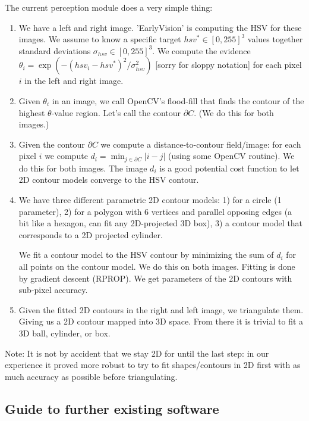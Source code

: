 The current perception module does a very simple thing:
\begin{enumerate}
\item We have a left and right image. 'EarlyVision' is computing the
  HSV for these images. We assume to know a specific target $hsv^*\in[0,255]^3$
  values together standard deviations $\sigma_{hsv}\in[0,255]^3$. We compute
  the evidence $\theta_i = \exp(- (hsv_i-hsv^*)^2/\sigma_{hsv}^2)$ [sorry for
    sloppy notation] for each pixel $i$ in the left and right image.

\item Given $\theta_i$ in an image, we call OpenCV's flood-fill that finds
  the contour of the highest $\theta$-value region. Let's call the contour
  $\partial C$. (We do this for both images.)

\item Given the contour $\partial C$ we compute a distance-to-contour
  field/image: for each pixel $i$ we compute $d_i = \min_{j\in\partial C}
  |i-j|$ (using some OpenCV routine). We do this for both images. The
  image $d_i$ is a good potential cost function to let 2D contour
  models converge to the HSV contour.

\item We have three different parametric 2D contour models: 1) for a
  circle (1 parameter), 2) for a polygon with 6 vertices and parallel
  opposing edges (a bit like a hexagon, can fit any 2D-projected 3D
  box), 3) a contour model that corresponds to a 2D projected
  cylinder.

  We fit a contour model to the HSV contour by minimizing the sum of
  $d_i$ for all points on the contour model. We do this on both
  images. Fitting is done by gradient descent (RPROP). We get
  parameters of the 2D contours with sub-pixel accuracy.

\item Given the fitted 2D contours in the right and left image, we
  triangulate them. Giving us a 2D contour mapped into 3D space. From
  there it is trivial to fit a 3D ball, cylinder, or box.

\end{enumerate}

Note: It is not by accident that we stay 2D for until the last step:
in our experience it proved more robust to try to fit shapes/contours
in 2D first with as much accuracy as possible before triangulating.



\subsection{Guide to further existing software}

